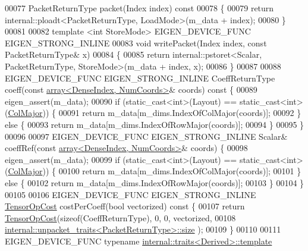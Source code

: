 \begin{DoxyCode}
00077   PacketReturnType packet(Index index)\textcolor{keyword}{ const}
00078 \textcolor{keyword}{  }\{
00079     \textcolor{keywordflow}{return} internal::ploadt<PacketReturnType, LoadMode>(m\_data + index);
00080   \}
00081 
00082   \textcolor{keyword}{template} <\textcolor{keywordtype}{int} StoreMode> EIGEN\_DEVICE\_FUNC EIGEN\_STRONG\_INLINE
00083   \textcolor{keywordtype}{void} writePacket(Index index, \textcolor{keyword}{const} PacketReturnType& x)
00084   \{
00085     \textcolor{keywordflow}{return} internal::pstoret<Scalar, PacketReturnType, StoreMode>(m\_data + index, x);
00086   \}
00087 
00088   EIGEN\_DEVICE\_FUNC EIGEN\_STRONG\_INLINE CoeffReturnType coeff(\textcolor{keyword}{const} 
      \hyperlink{class_eigen_1_1array}{array<DenseIndex, NumCoords>}& coords)\textcolor{keyword}{ const }\{
00089     eigen\_assert(m\_data);
00090     \textcolor{keywordflow}{if} (static\_cast<int>(Layout) == static\_cast<int>(\hyperlink{group__enums_ggaacded1a18ae58b0f554751f6cdf9eb13a0cbd4bdd0abcfc0224c5fcb5e4f6669a}{ColMajor})) \{
00091       \textcolor{keywordflow}{return} m\_data[m\_dims.IndexOfColMajor(coords)];
00092     \} \textcolor{keywordflow}{else} \{
00093       \textcolor{keywordflow}{return} m\_data[m\_dims.IndexOfRowMajor(coords)];
00094     \}
00095   \}
00096 
00097   EIGEN\_DEVICE\_FUNC EIGEN\_STRONG\_INLINE Scalar& coeffRef(\textcolor{keyword}{const} 
      \hyperlink{class_eigen_1_1array}{array<DenseIndex, NumCoords>}& coords) \{
00098     eigen\_assert(m\_data);
00099     \textcolor{keywordflow}{if} (static\_cast<int>(Layout) == static\_cast<int>(\hyperlink{group__enums_ggaacded1a18ae58b0f554751f6cdf9eb13a0cbd4bdd0abcfc0224c5fcb5e4f6669a}{ColMajor})) \{
00100       \textcolor{keywordflow}{return} m\_data[m\_dims.IndexOfColMajor(coords)];
00101     \} \textcolor{keywordflow}{else} \{
00102       \textcolor{keywordflow}{return} m\_data[m\_dims.IndexOfRowMajor(coords)];
00103     \}
00104   \}
00105 
00106   EIGEN\_DEVICE\_FUNC EIGEN\_STRONG\_INLINE \hyperlink{class_eigen_1_1_tensor_op_cost}{TensorOpCost} costPerCoeff(\textcolor{keywordtype}{bool} vectorized)\textcolor{keyword}{ const }\{
00107     \textcolor{keywordflow}{return} \hyperlink{class_eigen_1_1_tensor_op_cost}{TensorOpCost}(\textcolor{keyword}{sizeof}(CoeffReturnType), 0, 0, vectorized,
00108                         \hyperlink{struct_eigen_1_1internal_1_1unpacket__traits}{internal::unpacket\_traits<PacketReturnType>::size}
      );
00109   \}
00110 
00111   EIGEN\_DEVICE\_FUNC \textcolor{keyword}{typename} \hyperlink{struct_eigen_1_1internal_1_1traits}{internal::traits<Derived>::template} 

\end{DoxyCode}

